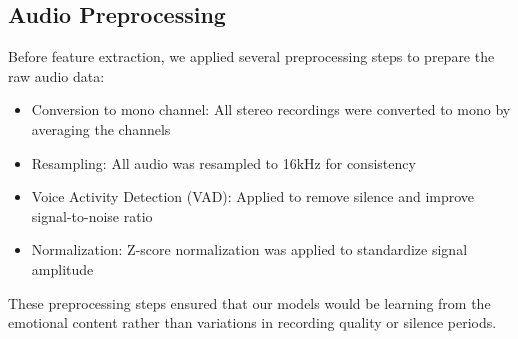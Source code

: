 \subsection{Audio Preprocessing}

Before feature extraction, we applied several preprocessing steps to prepare the raw audio data:

\begin{itemize}
    \item Conversion to mono channel: All stereo recordings were converted to mono by averaging the channels
    \item Resampling: All audio was resampled to 16kHz for consistency
    \item Voice Activity Detection (VAD): Applied to remove silence and improve signal-to-noise ratio
    \item Normalization: Z-score normalization was applied to standardize signal amplitude
\end{itemize}

These preprocessing steps ensured that our models would be learning from the emotional content rather than variations in recording quality or silence periods. 